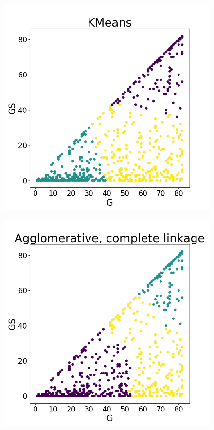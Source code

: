 \documentclass[a4paper]{article}
\begin{document}
\begin{figure}
\centering
\begin{minipage}{.22\textwidth}
  \centering
  \includegraphics[scale=0.14]{kmeans_g_gs_mp.png}
  \label{fig:kmeans_g_gs_mp}
\end{minipage}
\begin{minipage}{.22\textwidth}
  \centering
  \includegraphics[scale=0.14]{complete_link_g_gs_mp.png}

\end{minipage}
\end{figure}
\end{document}
